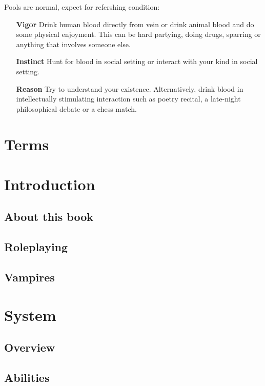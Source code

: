 \documentclass[a4paper, 12pt, finnish]{article}
\begin{document}
{\cols{
\VampiricKey{}
}

\pagebreak
Pools are normal, expect for refershing condition:

\begin{itemize}
\item[\textbf{Vigor}] Drink human blood directly from vein or drink animal blood and do some physical enjoyment. This can be hard partying, doing drugs, sparring or anything that involves someone else.
\item[\textbf{Instinct}] Hunt for blood in social setting or interact with your kind in social setting.
\item[\textbf{Reason}] Try to understand your existence. Alternatively, drink blood in intellectually stimulating interaction such as poetry recital, a late-night philosophical debate or a chess match.
\end{itemize}
}

\tableofcontents
\pagebreak

\section{Terms}\label{sec:terms}
\section{Introduction}\label{sec:introduction}
	\subsection{About this book}\label{ssec:about}
		
	\subsection{Roleplaying}\label{ssec:roleplaying}
		
	\subsection{Vampires}\label{ssec:vampires}
		
\section{System}\label{sec:System}
	\subsection{Overview}\label{ssec:overview}
		
	\subsection{Abilities}\label{ssec:abilities}
		
\end{document}
